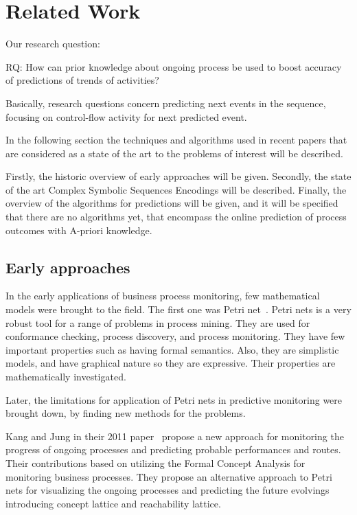\section{Related Work} %
\label{sec:related_work}


Our research question: 

RQ: How can prior knowledge about ongoing process be used to boost accuracy of predictions of trends of activities?

Basically, research questions concern predicting next events in the sequence, focusing on control-flow activity for next predicted event.   

In the following section the techniques and algorithms used in recent papers that are considered as a state of the art to the problems of interest will be described.

Firstly, the historic overview of early approaches will be given.
Secondly, the state of the art Complex Symbolic Sequences Encodings will be described. 
Finally, the overview of the algorithms for predictions will be given, and it will be specified that there are no algorithms yet, that encompass the online prediction of process outcomes with A-priori knowledge.



\subsection{Early approaches}

In the early applications of business process monitoring, few mathematical models were brought to the field. The first one was Petri net~\cite{doi:10.1142/S0218126698000043}. Petri nets is a very robust tool for a range of problems in process mining. They are used for conformance checking, process discovery, and process monitoring. They have few important properties such as having formal semantics. Also, they are simplistic models, and have graphical nature so they are expressive. Their properties are mathematically investigated. 

Later, the limitations for application of Petri nets in predictive monitoring were brought down, by finding new methods for the problems.

Kang and Jung in their 2011 paper~\cite{doi:10.1108/02635571111137241} propose a new approach for monitoring the progress of ongoing processes and predicting probable performances and routes. Their contributions based on utilizing the Formal Concept Analysis for monitoring business processes. They propose an alternative approach to Petri nets for visualizing the ongoing processes and predicting the future evolvings introducing concept lattice and reachability lattice.   

